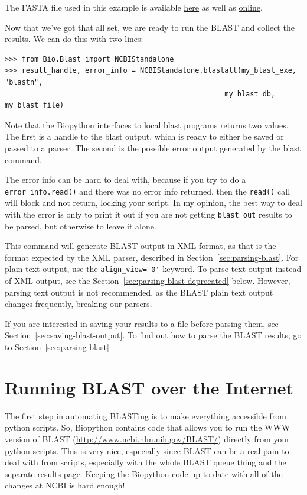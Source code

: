 \documentclass{report}
\begin{document}
The FASTA file used in this example is available
\href{examples/m\_cold.fasta}{here} as well as
\href{http://biopython.org/DIST/docs/tutorial/examples/m\_cold.fasta}{online}.

Now that we've got that all set, we are ready to run the BLAST and collect the results. We can do this with two lines:

\begin{verbatim}
>>> from Bio.Blast import NCBIStandalone
>>> result_handle, error_info = NCBIStandalone.blastall(my_blast_exe, "blastn",
                                                    my_blast_db, my_blast_file)
\end{verbatim}

Note that the Biopython interfaces to local blast programs returns two values. The first is a handle to the blast output, which is ready to either be saved or passed to a parser. The second is the possible error output generated by the blast command.

The error info can be hard to deal with, because if you try to do a \verb|error_info.read()| and there was no error info returned, then the \verb|read()| call will block and not return, locking your script. In my opinion, the best way to deal with the error is only to print it out if you are not getting \verb|blast_out| results to be parsed, but otherwise to leave it alone.


This command will generate BLAST output in XML format, as that is the format expected by the XML parser, described in Section~\ref{sec:parsing-blast}. For plain text output, use the \verb|align_view='0'| keyword. To parse text output instead of XML output, see the Section~\ref{sec:parsing-blast-deprecated} below. However, parsing text output is not recommended, as the BLAST plain text output changes frequently, breaking our parsers.

If you are interested in saving your results to a file before parsing them,
see Section~\ref{sec:saving-blast-output}. To find out how to parse the BLAST
results, go to Section~\ref{sec:parsing-blast}

\section{Running BLAST over the Internet}
\label{sec:running-www-blast}

The first step in automating BLASTing is to make everything accessible
from python scripts. So, Biopython contains code that allows you to
run the WWW version of BLAST
(\url{http://www.ncbi.nlm.nih.gov/BLAST/}) directly from
your python scripts. This is very nice, especially since BLAST can be
a real pain to deal with from scripts, especially with the whole BLAST
queue thing and the separate results page. Keeping the Biopython code
up to date with all of the changes at NCBI is hard enough!
\end{document}
